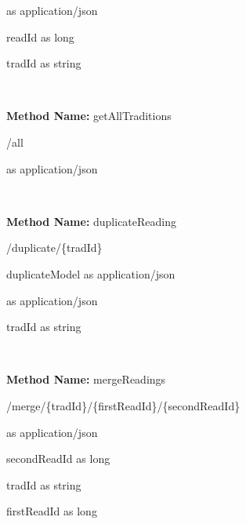 \begin{response}
 as application/json
\end{response}

\begin{parameter}
readId as long
\end{parameter}

\begin{parameter}
tradId as string
\end{parameter}

\

\textbf{Method Name: }getAllTraditions
\begin{get}
/all
\end{get}

\begin{response}
 as application/json
\end{response}

\

\textbf{Method Name: }duplicateReading
\begin{post}
/duplicate/\{tradId\}
\end{post}

\begin{request}
duplicateModel as application/json
\end{request}

\begin{response}
 as application/json
\end{response}

\begin{parameter}
tradId as string
\end{parameter}

\

\textbf{Method Name: }mergeReadings
\begin{post}
/merge/\{tradId\}/\{firstReadId\}/\{secondReadId\}
\end{post}

\begin{response}
 as application/json
\end{response}

\begin{parameter}
secondReadId as long
\end{parameter}

\begin{parameter}
tradId as string
\end{parameter}

\begin{parameter}
firstReadId as long
\end{parameter}

